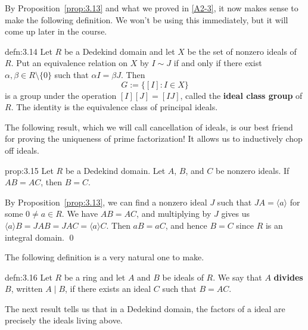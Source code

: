 By Proposition~\ref{prop:3.13} and what we proved in \ref{A2-3}, it now 
makes sense to make the following definition. We won't be using this 
immediately, but it will come up later in the course.

\begin{defn}{defn:3.14}
    Let $R$ be a Dedekind domain and let $X$ be the set of nonzero ideals of $R$. 
    Put an equivalence relation on $X$ by $I \sim J$ if and only if 
    there exist $\alpha, \beta \in R \setminus \{0\}$ such that 
    $\alpha I = \beta J$. Then 
    \[ G := \{ [I] : I \in X \} \] 
    is a group under the operation $[I][J] = [IJ]$, called the {\bf ideal 
    class group} of $R$. The identity is the equivalence class of 
    principal ideals. 
\end{defn}\vspace{-0.25cm}

The following result, which we will call cancellation of ideals, is our 
best friend for proving the uniqueness of prime factorization! 
It allows us to inductively chop off ideals. 

\begin{prop}{prop:3.15}
    Let $R$ be a Dedekind domain. Let $A$, $B$, and $C$ be nonzero ideals. 
    If $AB = AC$, then $B = C$. 
\end{prop}\vspace{-0.25cm}\newpage
\begin{pf}
    By Proposition~\ref{prop:3.13}, we can find a nonzero ideal $J$ 
    such that $JA = \langle a \rangle$ for some $0 \neq a \in R$. We have 
    $AB = AC$, and multiplying by $J$ gives us 
    $\langle a \rangle B = JAB = JAC = \langle a \rangle C$. 
    Then $aB = aC$, and hence $B = C$ since $R$ is an integral domain. \qed
\end{pf}\vspace{-0.25cm}

The following definition is a very natural one to make. 

\begin{defn}{defn:3.16}
    Let $R$ be a ring and let $A$ and $B$ be ideals of $R$. We say that 
    $A$ {\bf divides} $B$, written $A \mid B$, if there exists an 
    ideal $C$ such that $B = AC$. 
\end{defn}\vspace{-0.25cm}

The next result tells us that in a Dedekind domain, the factors of a 
ideal are precisely the ideals living above. 

